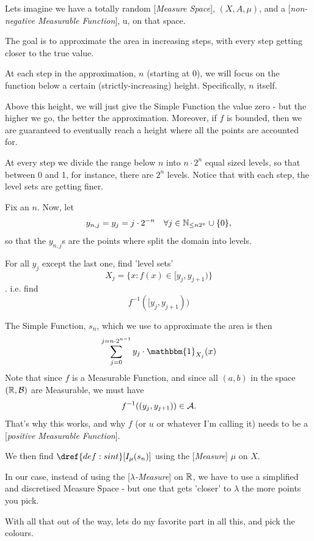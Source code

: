 \medskip
Lets imagine we have a totally random [\emph{Measure Space}], $(X, A, \mu)$, and a [\emph{non-negative Measurable Function}], u, on that space.

\medskip
The goal is to approximate the area in increasing steps, with every step getting closer to the true value.

\medskip
At each step in the approximation, $n$ (starting at 0), we will focus on the function below a certain (strictly-increasing) height. Specifically, $n$ itself.

\medskip
Above this height, we will just give the Simple Function the value zero - but the higher we go, the better the approximation. Moreover, if $f$ is bounded, then we are guaranteed to eventually reach a height where all the points are accounted for.

\medskip
At every step we divide the range below $n$ into $n \cdot 2^{n}$ equal sized levels, so that between 0 and 1, for instance, there are $2^{n}$ levels. Notice that with each step, the level sets are getting finer.

\medskip
Fix an $n$. Now, let $$y_{n,j} = y_j = j \cdot 2^{-n} \quad \forall j \in \mathbb{N}_{\leq n2^n} \cup \{0\}, $$ so that the $y_{n,j}$s are the points where split the domain into levels.

\medskip
For all $y_j$ except the last one, find 'level sets' $$X_j = \{x : f(x) \in [y_j, y_{j+1})\}$$ . i.e. find $$f^{-1}([y_j, y_{j+1}))$$

\medskip
The Simple Function, $s_n$, which we use to approximate the area is then $$\sum_{j=0}^{j=n\cdot2^{n - 1}} y_j \cdot \mathbbm{1}_{X_j}(x)$$ Note that since $f$ is a Measurable Function, and since all $(a, b)$ in the space $(\mathbb{R}, \mathcal{B})$ are Measurable, we must have $$f^{-1}((y_j, y_{j+1})) \in \mathcal{A}.$$ That's why this works, and why $f$ (or $u$ or whatever I'm calling it) needs to be a [\emph{positive Measurable Function}].

\medskip
We then find $\dref{def:sint}[I_{\mu}(s_n)]$ using the [\emph{Measure}] $\mu$ on $X$.

\medskip
In our case, instead of using the [$\lambda$\emph{-Measure}] on $\mathbb{R}$, we have to use a simplified and discretised Measure Space - but one that gets 'closer' to $\lambda$ the more points you pick.

\medskip
With all that out of the way, lets do my favorite part in all this, and pick the colours.

